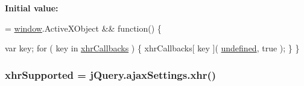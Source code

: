 {\bfseries Initial value\-:}
\begin{DoxyCode}
= \hyperlink{jquery-1_810_82_8js_a04a8a2bbfa9c15500892b8e5033d625b}{window}.ActiveXObject && \textcolor{keyword}{function}() \{
        
        var key;
        \textcolor{keywordflow}{for} ( key in \hyperlink{jquery-1_810_82_8js_a068f27a70831ff3a9e0ffa79e063847f}{xhrCallbacks} ) \{
            xhrCallbacks[ key ]( \hyperlink{jquery-1_810_82_8js_a08113a236cc18d2a9d5ce27e638012be}{undefined}, true );
        \}
    \}
\end{DoxyCode}
\hypertarget{jquery-1_810_82_8js_afd7e72f2f357a5a8b17e46776a6283eb}{
\subsubsection[{xhr\-Supported}]{\setlength{\rightskip}{0pt plus 5cm}xhr\-Supported = {\bf j\-Query.\-ajax\-Settings.\-xhr}()}}\label{jquery-1_810_82_8js_afd7e72f2f357a5a8b17e46776a6283eb}
